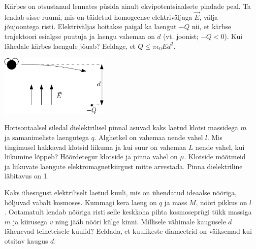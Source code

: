 \documentclass[10pt]{article}
\begin{document}
{
Kärbes on otsustanud
lennates püsida ainult ekvipotentsiaalsete pindade peal. Ta lendab sisse ruumi,
mis on täidetud homogeense elektriväljaga $\vec{E}$, välja jõujoontega risti.
Elektriväljas hoitakse paigal ka laengut $-Q$ nii, et kärbse
trajektoori esialgse puutuja ja laengu vahemaa on $d$ (vt. joonist; $-Q < 0$).
Kui lähedale kärbes laengule jõuab? Eeldage, et $Q \le \pi\epsilon_0Ed^2$.
\begin{center}
	\includegraphics[width=0.4\textwidth]{2010-lahg-07-muha_tekst}
\end{center}
\probend
\bigskip


Horisontaalsel siledal dielektrilisel pinnal asuvad kaks laetud klotsi massidega $m$ ja samanimeliste laengutega $q$. Alghetkel on vahemaa nende vahel $l$. Mis tingimusel hakkavad klotsid liikuma ja kui suur on vahemaa $L$ nende vahel, kui liikumine lõppeb? Hõõrdetegur klotside ja pinna vahel on $\mu$. Klotside mõõtmeid ja liikuvate laengute elektromagnetkiirgust mitte arvestada. Pinna dielektriline läbitavus on 1.
\probend
\bigskip


Kaks ühesugust elektriliselt laetud
kuuli, mis on ühendatud ideaalse nööriga, hõljuvad vabalt kosmoses. Kummagi
kera laeng on $q$ ja mass $M$, nööri pikkus on $l$.
Ootamatult lendab nööriga risti selle keskkoha pihta kosmoseprügi tükk massiga $m$ ja kiirusega
$v$ ning jääb nööri külge kinni. Millisele vähimale kaugusele $d$ lähenevad teineteisele kuulid?
Eeldada, et kuulikeste diameetrid on väiksemad kui otsitav kaugus $d$.
\probend
\bigskip
\newpage\subsection{\protect{}}


}
\end{document}
